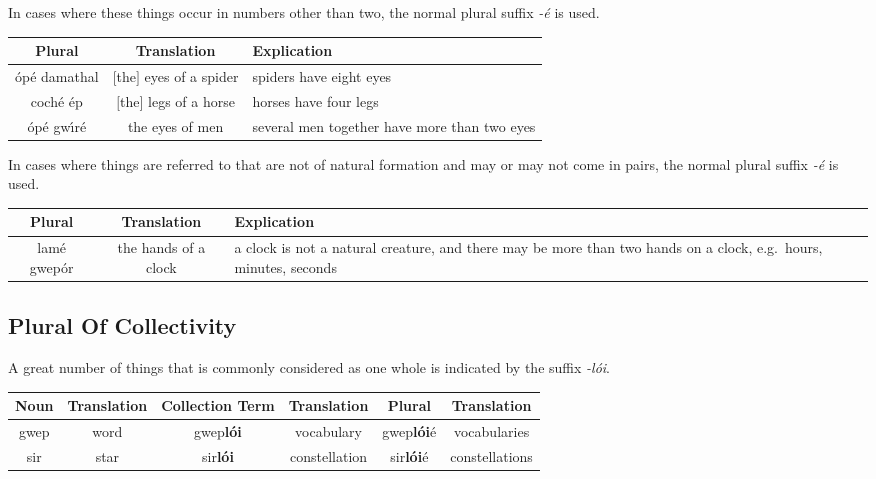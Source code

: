 In cases where these things occur in numbers other than two, the normal plural suffix \textit{-\'{e}} is used.
\begin{table}[H]
\centering
\begin{tabu}{c|c|M{10.0cm}}
  \textbf{Plural} & \textbf{Translation} & \textbf{Explication}\\
  \toprule
  \'{o}p\'{e} damathal & $[$the$]$ eyes of a spider & spiders have eight eyes\\
  coch\'{e} \'{e}p & $[$the$]$ legs of a horse & horses have four legs\\
  \'{o}p\'{e} gw\'{\i}r\'{e} & the eyes of men & several men together have more than two eyes
\end{tabu}
\label{example_plural_more_than_two}
\end{table}

In cases where things are referred to that are not of natural formation and may or may not come in pairs, the normal plural suffix \textit{-\'{e}} is used.
\begin{table}[H]
\centering
\begin{tabu}{c|c|M{10.0cm}}
  \textbf{Plural} & \textbf{Translation} & \textbf{Explication}\\
  \toprule
  lam\'{e} gwep\'{o}r & the hands of a clock & a clock is not a natural creature, and there may be more than two hands on a clock, e.g.\ hours, minutes, seconds\\
\end{tabu}
\label{example_plural_may_or_not}
\end{table}

\subsection{Plural Of Collectivity}

A great number of things that is commonly considered as one whole is indicated by the suffix \textit{-l\'{o}i}.
\begin{table}[H]
\centering
\begin{tabu}{c|c|c|c|c|c}
  \textbf{Noun} & \textbf{Translation} & \textbf{Collection Term} & \textbf{Translation} & \textbf{Plural} & \textbf{Translation}\\
  \toprule
  gwep & word & gwep\textbf{l\'{o}i} & vocabulary & gwep\textbf{l\'{o}i}\'{e} & vocabularies\\
  sir & star & sir\textbf{l\'{o}i} & constellation & sir\textbf{l\'{o}i}\'{e} & constellations
\end{tabu}
\label{example_plural_one_whole}
\end{table}

